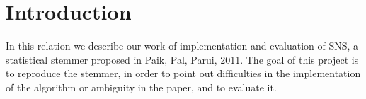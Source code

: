 \section{Introduction}
    In this relation we describe our work of implementation and evaluation of SNS, a statistical stemmer proposed in Paik, Pal, Parui, 2011. The goal of this project is to reproduce the stemmer, in order to point out difficulties in the implementation of the algorithm or ambiguity in the paper, and to evaluate it.